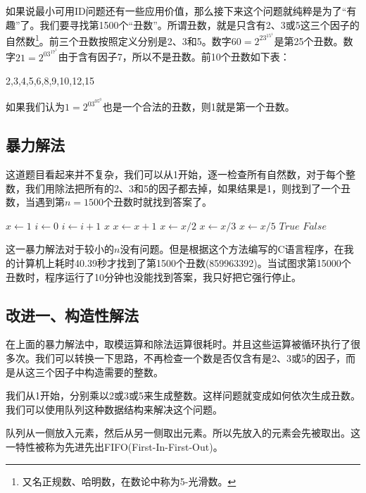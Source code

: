 \documentclass{article}
\begin{document}
如果说最小可用ID问题还有一些应用价值，那么接下来这个问题就纯粹是为了“有趣”了。我们要寻找第1500个“丑数”。所谓丑数，就是只含有2、3或5这三个因子的自然数\footnote{又名正规数、哈明数，在数论中称为5-光滑数。}。前三个丑数按照定义分别是2、3和5。数字$60 = 2^23^15^1$是第25个丑数。数字$21 = 2^03^17^1$由于含有因子7，所以不是丑数。前10个丑数如下表：

2,3,4,5,6,8,9,10,12,15

如果我们认为$1=2^03^05^0$也是一个合法的丑数，则1就是第一个丑数。

\subsection{暴力解法}

这道题目看起来并不复杂，我们可以从1开始，逐一检查所有自然数，对于每个整数，我们用除法把所有的2、3和5的因子都去掉，如果结果是1，则找到了一个丑数，当遇到第$n=1500$个丑数时就找到答案了。

\begin{algorithmic}[1]
  \State $x \gets 1$
  \State $i \gets 0$
  \Loop
      \State $i \gets i + 1$
        \State \Return $x$
      \EndIf
    \EndIf
    \State $x \gets x + 1$
  \EndLoop
\EndFunction
\Statex
{}
    \State $x \gets x / 2$
  \EndWhile
    \State $x \gets x / 3$
  \EndWhile
    \State $x \gets x / 5$
  \EndWhile
    \State \Return $True$
  \Else
    \State \Return $False$
  \EndIf
\EndFunction
\end{algorithmic}

这一暴力解法对于较小的$n$没有问题。但是根据这个方法编写的C语言程序，在我的计算机上耗时40.39秒才找到了第1500个丑数(859963392)。当试图求第15000个丑数时，程序运行了10分钟也没能找到答案，我只好把它强行停止。

\subsection{改进一、构造性解法}
在上面的暴力解法中，取模运算和除法运算很耗时\cite{Bentley}。并且这些运算被循环执行了很多次。我们可以转换一下思路，不再检查一个数是否仅含有是2、3或5的因子，而是从这三个因子中构造需要的整数。

我们从1开始，分别乘以2或3或5来生成整数。这样问题就变成如何依次生成丑数。我们可以使用队列这种数据结构来解决这个问题。

队列从一侧放入元素，然后从另一侧取出元素。所以先放入的元素会先被取出。这一特性被称为先进先出FIFO(First-In-First-Out)。
\end{document}
